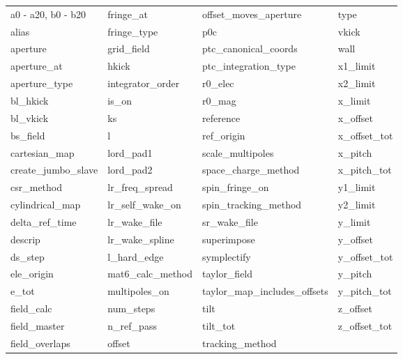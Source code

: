  \begin{tabular}{llll} \toprule
a0 - a20, b0 - b20          & fringe_at                   & offset_moves_aperture       & type                        \\
alias                       & fringe_type                 & p0c                         & vkick                       \\
aperture                    & grid_field                  & ptc_canonical_coords        & wall                        \\
aperture_at                 & hkick                       & ptc_integration_type        & x1_limit                    \\
aperture_type               & integrator_order            & r0_elec                     & x2_limit                    \\
bl_hkick                    & is_on                       & r0_mag                      & x_limit                     \\
bl_vkick                    & ks                          & reference                   & x_offset                    \\
bs_field                    & l                           & ref_origin                  & x_offset_tot                \\
cartesian_map               & lord_pad1                   & scale_multipoles            & x_pitch                     \\
create_jumbo_slave          & lord_pad2                   & space_charge_method         & x_pitch_tot                 \\
csr_method                  & lr_freq_spread              & spin_fringe_on              & y1_limit                    \\
cylindrical_map             & lr_self_wake_on             & spin_tracking_method        & y2_limit                    \\
delta_ref_time              & lr_wake_file                & sr_wake_file                & y_limit                     \\
descrip                     & lr_wake_spline              & superimpose                 & y_offset                    \\
ds_step                     & l_hard_edge                 & symplectify                 & y_offset_tot                \\
ele_origin                  & mat6_calc_method            & taylor_field                & y_pitch                     \\
e_tot                       & multipoles_on               & taylor_map_includes_offsets & y_pitch_tot                 \\
field_calc                  & num_steps                   & tilt                        & z_offset                    \\
field_master                & n_ref_pass                  & tilt_tot                    & z_offset_tot                \\
field_overlaps              & offset                      & tracking_method             &                             \\
 \bottomrule
 \end{tabular}
